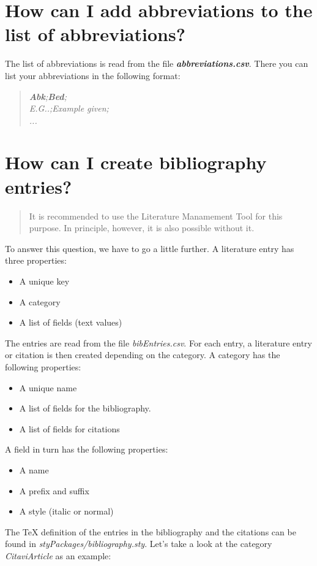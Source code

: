 \documentclass[12pt]{article}
\begin{document}
\section{How can I add abbreviations to the list of abbreviations?}
The list of abbreviations is read from the file \textbf{\textit{abbreviations.csv}}. There you can list your abbreviations in the following format:
\begin{quote}
\textit{\textbf{Abk};\textbf{Bed};}\\
\textit{E.G..;Example given;}\\
\textit{...}
\end{quote}

\section{How can I create bibliography entries?}
\begin{quote}
It is recommended to use the Literature Manamement Tool for this purpose. In principle, however, it is also possible without it.
\end{quote}
To answer this question, we have to go a little further. A literature entry has three properties:
\begin{itemize}
\item A unique key
\item A category
\item A list of fields (text values)
\end{itemize}
The entries are read from the file \textit{bibEntries.csv}. For each entry, a literature entry or citation is then created depending on the category.
A category has the following properties:
\begin{itemize}
\item A unique name
\item A list of fields for the bibliography.
\item A list of fields for citations
\end{itemize}
A field in turn has the following properties:
\begin{itemize}
\item A name
\item A prefix and suffix
\item A style (italic or normal)
\end{itemize}
The TeX definition of the entries in the bibliography and the citations can be found in \textit{styPackages/bibliography.sty}. Let's take a look at the category \textit{CitaviArticle} as an example:
\end{document}

